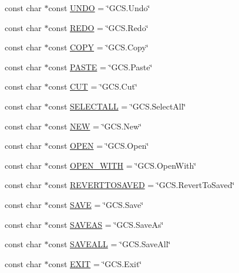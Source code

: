 \begin{DoxyCompactItemize}
\item 
const char $\ast$const \hyperlink{group___core_plugin_ga34ddc9153ce99ae69ebbe146e121719f}{U\-N\-D\-O} = \char`\"{}G\-C\-S.\-Undo\char`\"{}
\item 
const char $\ast$const \hyperlink{group___core_plugin_ga9daeef790ade4478da4320d3fd006532}{R\-E\-D\-O} = \char`\"{}G\-C\-S.\-Redo\char`\"{}
\item 
const char $\ast$const \hyperlink{group___core_plugin_gaa1db11f59291095e04627940894961fc}{C\-O\-P\-Y} = \char`\"{}G\-C\-S.\-Copy\char`\"{}
\item 
const char $\ast$const \hyperlink{group___core_plugin_ga1fea14e3f4d0203c54ff91a495a3cc6b}{P\-A\-S\-T\-E} = \char`\"{}G\-C\-S.\-Paste\char`\"{}
\item 
const char $\ast$const \hyperlink{group___core_plugin_ga81faf7dc9520b27201aca63aa91304ba}{C\-U\-T} = \char`\"{}G\-C\-S.\-Cut\char`\"{}
\item 
const char $\ast$const \hyperlink{group___core_plugin_ga088348a7f32fe0a36bc24dfb67dfbdab}{S\-E\-L\-E\-C\-T\-A\-L\-L} = \char`\"{}G\-C\-S.\-Select\-All\char`\"{}
\item 
const char $\ast$const \hyperlink{group___core_plugin_ga9dd395d533e9222eaf46cbd786386c6d}{N\-E\-W} = \char`\"{}G\-C\-S.\-New\char`\"{}
\item 
const char $\ast$const \hyperlink{group___core_plugin_ga9c2bccd3a88aafefdd2327622cb47a73}{O\-P\-E\-N} = \char`\"{}G\-C\-S.\-Open\char`\"{}
\item 
const char $\ast$const \hyperlink{group___core_plugin_gaead1f37ead69aad73333544a537be09b}{O\-P\-E\-N\-\_\-\-W\-I\-T\-H} = \char`\"{}G\-C\-S.\-Open\-With\char`\"{}
\item 
const char $\ast$const \hyperlink{group___core_plugin_gab887a9b6e7f92df3ecb462f16052e0ae}{R\-E\-V\-E\-R\-T\-T\-O\-S\-A\-V\-E\-D} = \char`\"{}G\-C\-S.\-Revert\-To\-Saved\char`\"{}
\item 
const char $\ast$const \hyperlink{group___core_plugin_ga86ee3b2c1b2de5786a3f7bc6b5a253e7}{S\-A\-V\-E} = \char`\"{}G\-C\-S.\-Save\char`\"{}
\item 
const char $\ast$const \hyperlink{group___core_plugin_gaa13d26deceb0015f1a40623ffd6c3e54}{S\-A\-V\-E\-A\-S} = \char`\"{}G\-C\-S.\-Save\-As\char`\"{}
\item 
const char $\ast$const \hyperlink{group___core_plugin_ga79482639b023a73967e432824a1746da}{S\-A\-V\-E\-A\-L\-L} = \char`\"{}G\-C\-S.\-Save\-All\char`\"{}
\item 
const char $\ast$const \hyperlink{group___core_plugin_ga83e07a95322a89ce775c68835ba44e76}{E\-X\-I\-T} = \char`\"{}G\-C\-S.\-Exit\char`\"{}

\end{DoxyCompactItemize}
